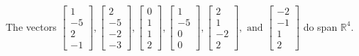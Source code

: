 \begin{exercise}
\begin{exerciseStatement}
  \end{exerciseStatement}
  \begin{exerciseAnswer}
   The vectors \(\left[\begin{array}{r}
1 \\
-5 \\
2 \\
-1
\end{array}\right] , \left[\begin{array}{r}
2 \\
-5 \\
-2 \\
-3
\end{array}\right] , \left[\begin{array}{r}
0 \\
1 \\
1 \\
2
\end{array}\right] , \left[\begin{array}{r}
1 \\
-5 \\
0 \\
0
\end{array}\right] , \left[\begin{array}{r}
2 \\
1 \\
-2 \\
2
\end{array}\right] , \text{ and } \left[\begin{array}{r}
-2 \\
-1 \\
1 \\
2
\end{array}\right]\) 
  	 do  
	span \(\mathbb{R}^4\).
  


  \end{exerciseAnswer}
\end{exercise}